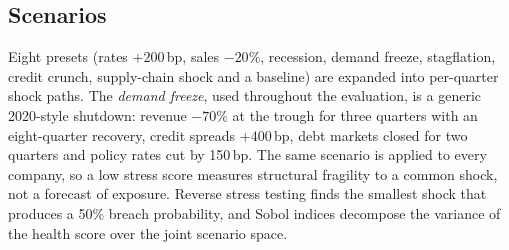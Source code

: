 \subsection{Scenarios}
Eight presets (rates $+200$\,bp, sales $-20\%$, recession, demand freeze, stagflation, credit crunch, supply-chain shock and a baseline) are expanded into per-quarter shock paths. The \emph{demand freeze}, used throughout the evaluation, is a generic 2020-style shutdown: revenue $-70\%$ at the trough for three quarters with an eight-quarter recovery, credit spreads $+400$\,bp, debt markets closed for two quarters and policy rates cut by 150\,bp. The same scenario is applied to every company, so a low stress score measures structural fragility to a common shock, not a forecast of exposure. Reverse stress testing finds the smallest shock that produces a 50\% breach probability, and Sobol indices \citep{sobol2001,saltelli2010} decompose the variance of the health score over the joint scenario space.
